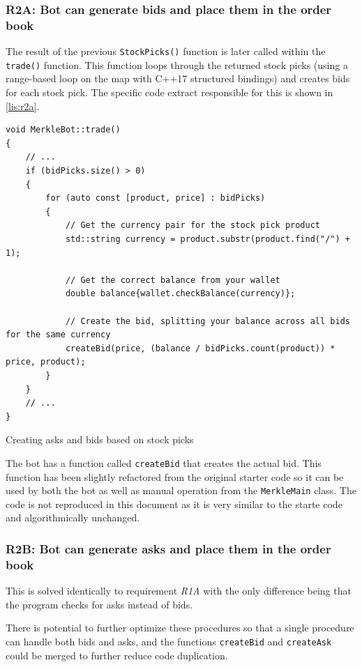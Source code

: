 \subsubsection{R2A: Bot can generate bids and place them in the order book}

The result of the previous \texttt{StockPicks()} function is later called within the \texttt{trade()} function. This function loops through the returned stock picks (using a range-based loop on the map with C++17 structured bindings) and creates bids for each stock pick. The specific code extract responsible for this is shown in \autoref{lis:r2a}.

\begin{listing}[H]
	\begin{verbatim}
void MerkleBot::trade()
{
	// ...
	if (bidPicks.size() > 0)
	{
		for (auto const [product, price] : bidPicks)
		{
			// Get the currency pair for the stock pick product
			std::string currency = product.substr(product.find("/") + 1);

			// Get the correct balance from your wallet
			double balance{wallet.checkBalance(currency)};

			// Create the bid, splitting your balance across all bids for the same currency
			createBid(price, (balance / bidPicks.count(product)) * price, product);
		}
	}
	// ... 
}
	\end{verbatim}
	\caption{Creating asks and bids based on stock picks}
	\label{lis:r2a}
\end{listing}

The bot has a function called \texttt{createBid} that creates the actual bid. This function has been slightly refactored from the original starter code so it can be used by both the bot as well as manual operation from the \texttt{MerkleMain} class. The code is not reproduced in this document as it is very similar to the starte code and algorithmically unchanged.

\subsubsection{R2B: Bot can generate asks and place them in the order book}
This is solved identically to requirement \emph{R1A}  with the only difference being that the program checks for asks instead of bids.

There is potential to further optimize these procedures so that a single procedure can handle both bids and asks, and the functions \texttt{createBid} and \texttt{createAsk} could be merged to further reduce code duplication.

